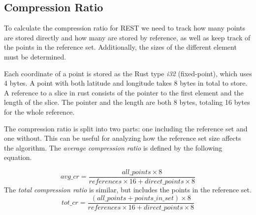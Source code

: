 \subsection{Compression Ratio}
To calculate the compression ratio for REST we need to track how many points are stored directly and how many are stored by reference, as well as keep track of the points in the reference set. Additionally, the sizes of the different element must be determined.

Each coordinate of a point is stored as the Rust type \textit{i32} (fixed-point), which uses 4 bytes. A point with both latitude and longitude takes 8 bytes in total to store. A reference to a slice in rust consists of the pointer to the first element and the length of the slice. The pointer and the length are both 8 bytes, totaling 16 bytes for the whole reference.

The compression ratio is split into two parts: one including the reference set and one without. This can be useful for analyzing how the reference set size affects the algorithm. The \textit{average compression ratio} is defined by the following equation.

\begin{equation}\label{eq:avg_cr}
    avg\_cr = \frac{all\_points \times 8}{references \times 16 + direct\_points \times 8}
\end{equation}
The \textit{total compression ratio} is similar, but includes the points in the reference set.
\begin{equation}\label{eq:tot_cr}
    tot\_cr = \frac{(all\_points + points\_in\_set) \times 8}{references \times 16 + direct\_points \times 8}
\end{equation}


